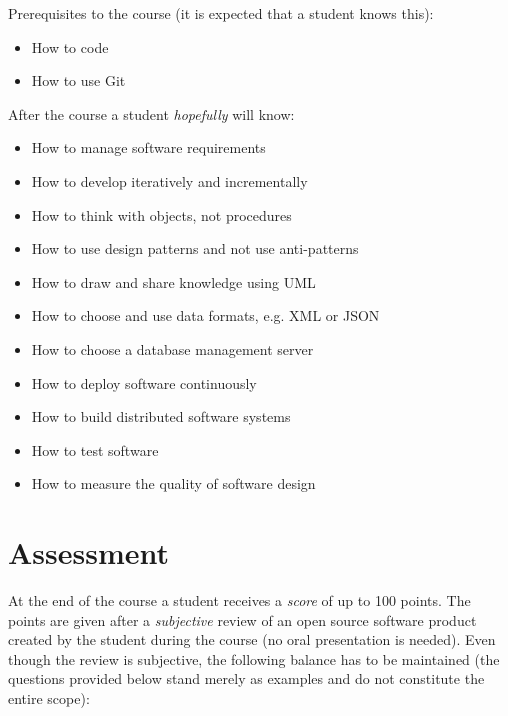 \documentclass[nobrand,anonymous,nodate,nosecurity]{huawei}
\begin{document}
Prerequisites to the course (it is expected that a student knows this):

\begin{itemize}
\item How to code
\item How to use Git
\end{itemize}

After the course a student \emph{hopefully} will know:

\begin{itemize}
\item How to manage software requirements
\item How to develop iteratively and incrementally
\item How to think with objects, not procedures
\item How to use design patterns and not use anti-patterns
\item How to draw and share knowledge using UML
\item How to choose and use data formats, e.g. XML or JSON
\item How to choose a database management server
\item How to deploy software continuously
\item How to build distributed software systems
\item How to test software
\item How to measure the quality of software design
\end{itemize}

\newpage
\section*{Assessment}

At the end of the course a student receives a \emph{score} of up
to 100 points. The points are given after a \emph{subjective} review
of an open source software product created by the student during the
course (no oral presentation is needed).
Even though the review is subjective, the following
balance has to be maintained (the questions provided below
stand merely as examples and do not constitute the entire scope):
\end{document}
